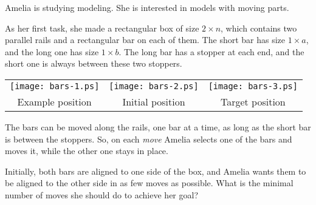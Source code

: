 Amelia is studying modeling. She is interested in models with moving parts.

As her first task, she made a rectangular box of size $2 \times n$, which contains two parallel rails and a rectangular bar on each of them. The short bar has size $1 \times a$, and the long one has size $1 \times b$. The long bar has a stopper at each end, and the short one is always between these two stoppers.

\begin{center}
\begin{tabular}{ccc}
\texttt{[image: bars-1.ps]} & \texttt{[image: bars-2.ps]} & \texttt{[image: bars-3.ps]} \\
Example position & Initial position & Target position \\
\end{tabular}
\end{center}

The bars can be moved along the rails, one bar at a time, as long as the short bar is between the stoppers. So, on each \textit{move} Amelia selects one of the bars and moves it, while the other one stays in place.

Initially, both bars are aligned to one side of the box, and Amelia wants them to be aligned to the other side in as few moves as possible. What is the minimal number of moves she should do to achieve her goal?